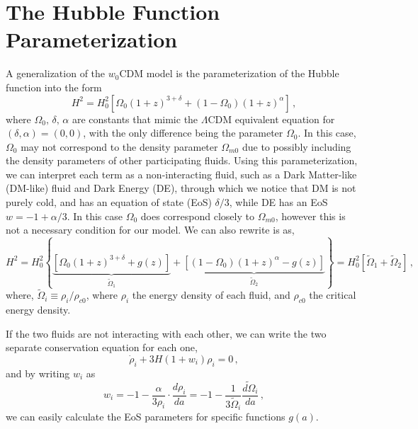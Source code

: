 \documentclass{book}
\begin{document}
	\section{The Hubble Function Parameterization}
	A generalization of the $w_0$CDM model is the parameterization of the Hubble function into the form
	\begin{equation}
		H^2=H^2_0\left[ \Omega_0(1+z)^{3+\delta} + (1-\Omega_0)(1+z)^\alpha \right]\, ,
	\end{equation}
	where $\Omega_0,\,\delta,\,\alpha$ are constants that mimic the $\Lambda$CDM equivalent equation for $(\delta,\alpha)=(0,0)$, with the only difference being the parameter $\Omega_0$. In this case, $\Omega_0$ may not correspond to the density parameter $\Omega_{m0}$ due to possibly including the density parameters of other participating fluids. Using this parameterization, we can interpret each term as a non-interacting fluid, such as a Dark Matter-like (DM-like) fluid and Dark Energy (DE), through which we notice that DM is not purely cold, and has an equation of state (EoS) $\delta/3$, while DE has an EoS $w=-1+\alpha/3$. In this case $\Omega_{0}$ does correspond closely to $\Omega_{m0}$, however this is not a necessary condition for our model. We can also rewrite is as,
	\begin{equation}
		H^2=H^2_0 \left\{ \underbrace{ \left[ \Omega_0(1+z)^{3+\delta} +g(z) \right]}_{\tilde{\Omega}_1} + \underbrace{ \left[ (1-\Omega_0)(1+z)^\alpha-g(z) \right]}_{\tilde{\Omega}_2} \right\}= H^2_0\left[ \tilde{\Omega}_1 + \tilde{\Omega}_2 \right] \, ,
	\end{equation} 
	where, $\tilde{\Omega}_i \equiv \rho_i/\rho_{c0}$, where $\rho_i$ the energy density of each fluid, and $\rho_{c0}$ the critical energy density. 
	
	If the two fluids are not interacting with each other, we can write the two separate conservation equation for each one,
	\begin{equation}
			\dot \rho_i + 3H(1+w_i)\rho_i=0 \, , 
	\end{equation}
	and by writing $w_i$ as
	\begin{equation}
		w_i=-1-\frac{\alpha}{3\rho_i}\cdot \frac{d\rho_i}{da}=-1-\frac{1}{3\tilde{\Omega}_i}\frac{\tilde{d \Omega}_i}{da}\, ,
	\end{equation}
	we can easily calculate the EoS parameters for specific functions $g(a)$.
	
\end{document}
